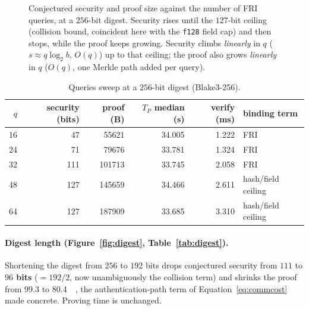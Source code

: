 \documentclass[11pt]{article}
\begin{document}
\begin{figure}[htbp]\centering
{}
\caption{Conjectured security and proof size against the number of FRI queries, at a $256$-bit digest.
Security rises until the $127$-bit ceiling (collision bound, coincident here with the \texttt{f128}
field cap) and then stops, while the proof keeps growing. Security climbs \emph{linearly} in $q$
($s\approx q\log_2 b$, $O(q)$) up to that ceiling; the proof also grows \emph{linearly} in $q$ ($O(q)$,
one Merkle path added per query).}
\label{fig:queries}
\end{figure}

\begin{table}[htbp]\centering\footnotesize
\caption{Queries sweep at a $256$-bit digest (Blake3-256).}
\label{tab:queries}
\begin{tabular}{r r r r r l}
\toprule
$q$ & security (bits) & proof (B) & $T_P$ median (s) & verify (ms) & binding term \\
\midrule
16 & 47  & \num{55621}  & 34.005 & 1.222 & FRI \\
24 & 71  & \num{79676}  & 33.781 & 1.324 & FRI \\
32 & 111 & \num{101713} & 33.745 & 2.058 & FRI \\
48 & 127 & \num{145659} & 34.466 & 2.611 & hash/field ceiling \\
64 & 127 & \num{187909} & 33.685 & 3.310 & hash/field ceiling \\
\bottomrule
\end{tabular}
\end{table}

\paragraph{Digest length (Figure~\ref{fig:digest}, Table~\ref{tab:digest}).} Shortening the digest from
$256$ to $192$ bits drops conjectured security from $111$ to \textbf{$96$ bits} ($=192/2$, now
unambiguously the collision term) and shrinks the proof from $99.3$ to \SI{80.4}{\kibi\byte}, the
authentication-path term of Equation~\eqref{eq:commcost} made concrete. Proving time is unchanged.
\end{document}
